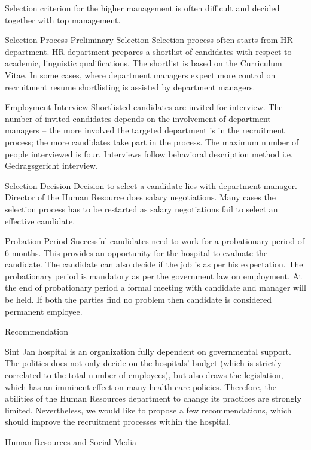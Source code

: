 \documentclass[a4paper,fleqn,11pt,dvips,titlepage]{article}
\numberwithin{figure}{section}
\numberwithin{equation}{section}
\begin{document}
Selection criterion for the higher management is often difficult and decided together with top management.


Selection Process
Preliminary Selection
Selection process often starts from HR department. HR department prepares a shortlist of candidates with respect to academic, linguistic qualifications. The shortlist is based on the Curriculum Vitae. In some cases, where department managers expect more control on recruitment resume shortlisting is assisted by department managers. 

Employment Interview
Shortlisted candidates are invited for interview. The number of invited candidates depends on the involvement of department managers – the more involved the targeted department is in the recruitment process; the more candidates take part in the process. The maximum number of people interviewed is four. Interviews follow behavioral description method i.e. Gedragsgericht interview. 

Selection Decision
Decision to select a candidate lies with department manager. Director of the Human Resource does salary negotiations. Many cases the selection process has to be restarted as salary negotiations fail to select an effective candidate.


Probation Period
 Successful candidates need to work for a probationary period of 6 months. This provides an opportunity for the hospital to evaluate the candidate. The candidate can also decide if the job is as per his expectation. The probationary period is mandatory as per the government law on employment. At the end of probationary period a formal meeting with candidate and manager will be held. If both the parties find no problem then candidate is considered permanent employee.


Recommendation

Sint Jan hospital is an organization fully dependent on governmental support. The politics does not only decide on the hospitals’ budget (which is strictly correlated to the total number of employees), but also draws the legislation, which has an imminent effect on many health care policies. Therefore, the abilities of the Human Resources department to change its practices are strongly limited. Nevertheless, we would like to propose a few recommendations, which should improve the recruitment processes within the hospital. 

Human Resources and Social Media
\end{document}
